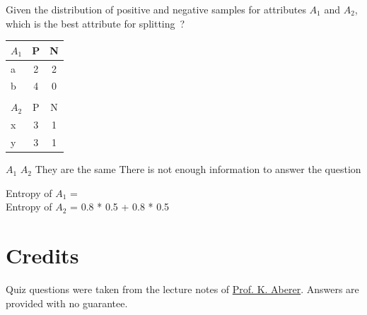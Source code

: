 \documentclass[12pt,a4paper,answers]{exam} %
\newcommand{\staff}{\href{http://people.epfl.ch//karl.aberer}{Prof. K. Aberer}}
\begin{document}
\begin{flushleft}
\begin{multicols*}{2}
\begin{questions}
\question Given the distribution of positive and negative samples for attributes $A_1$ and $A_2$, which is the best attribute for splitting~?
\begin{coltab}
\centering
\begin{tabular}{l c c}
\hline
$A_1$ & P & N\\
\hline
\hline
a & 2 & 2\\
b & 4 & 0\\
\hline
\\
\hline
$A_2$ & P & N\\
\hline
\hline
x & 3 & 1\\
y & 3 & 1\\
\hline
\end{tabular}
\end{coltab}
\begin{checkboxes}
\CorrectChoice $A_1$
\choice $A_2$
\choice They are the same
\choice There is not enough information to answer the question
\end{checkboxes}
\begin{solution}
Entropy of $A_1$ =  \\
Entropy of $A_2$ = 0.8 * 0.5 + 0.8 * 0.5
\end{solution}

\end{questions}
\end{multicols*}
\end{flushleft}


\section*{Credits}
Quiz questions were taken from the lecture notes of \staff. Answers are provided with no guarantee.%

%
\end{document}
